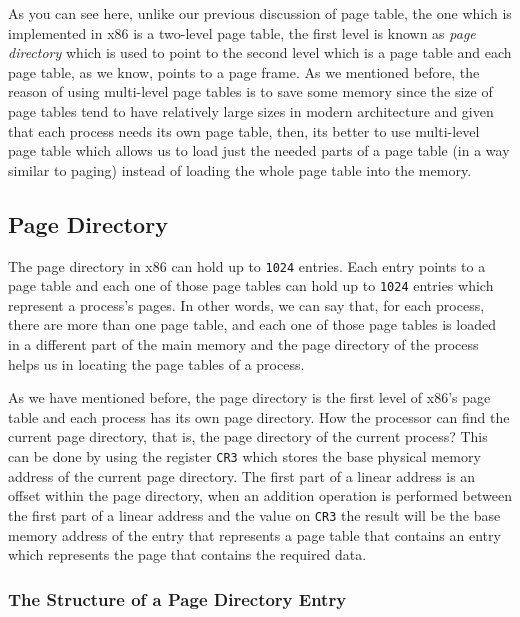 As you can see here, unlike our previous discussion of page table, the
one which is implemented in x86 is a two-level page table, the first
level is known as \emph{page directory} which is used to point to the
second level which is a page table and each page table, as we know,
points to a page frame. As we mentioned before, the reason of using
multi-level page tables is to save some memory since the size of page
tables tend to have relatively large sizes in modern architecture and
given that each process needs its own page table, then, its better to
use multi-level page table which allows us to load just the needed parts
of a page table (in a way similar to paging) instead of loading the
whole page table into the memory.

\subsection{Page Directory}\label{page-directory}

The page directory in x86 can hold up to \lstinline!1024! entries. Each
entry points to a page table and each one of those page tables can hold
up to \lstinline!1024! entries which represent a process's pages. In
other words, we can say that, for each process, there are more than one
page table, and each one of those page tables is loaded in a different
part of the main memory and the page directory of the process helps us
in locating the page tables of a process.

As we have mentioned before, the page directory is the first level of
x86's page table and each process has its own page directory. How the
processor can find the current page directory, that is, the page
directory of the current process? This can be done by using the register
\lstinline!CR3! which stores the base physical memory address of the
current page directory. The first part of a linear address is an offset
within the page directory, when an addition operation is performed
between the first part of a linear address and the value on
\lstinline!CR3! the result will be the base memory address of the entry
that represents a page table that contains an entry which represents the
page that contains the required data.

\subsubsection{The Structure of a Page Directory
Entry}\label{the-structure-of-a-page-directory-entry}


